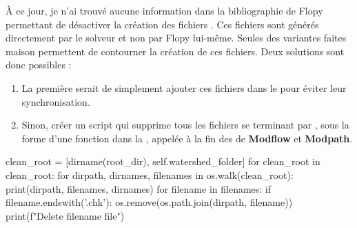À ce jour, je n’ai trouvé aucune information dans la bibliographie de Flopy permettant de désactiver la création des fichiers . Ces fichiers sont générés directement par le solveur et non par Flopy lui-même. Seules des variantes faites maison permettent de contourner la création de ces fichiers. Deux solutions sont donc possibles :

\begin{enumerate}
    \item La première serait de simplement ajouter ces fichiers dans le  pour éviter leur synchronisation. 
    \item Sinon, créer un script qui supprime tous les fichiers se terminant par , sous la forme d'une fonction  dans la , appelée à la fin des  de \textbf{Modflow} et \textbf{Modpath}.
\end{enumerate}

\begin{pythoncode}[]
    clean_root = [dirname(root_dir), self.watershed_folder] 
    for clean_root in clean_root: 
        for dirpath, dirnames, filenames in os.walk(clean_root): 
            print(dirpath, filenames, dirnames) 
            for filename in filenames: 
                if filename.endswith('.chk'): 
                    os.remove(os.path.join(dirpath, filename)) 
                    print(f"Delete {filename} file") 
\end{pythoncode}


